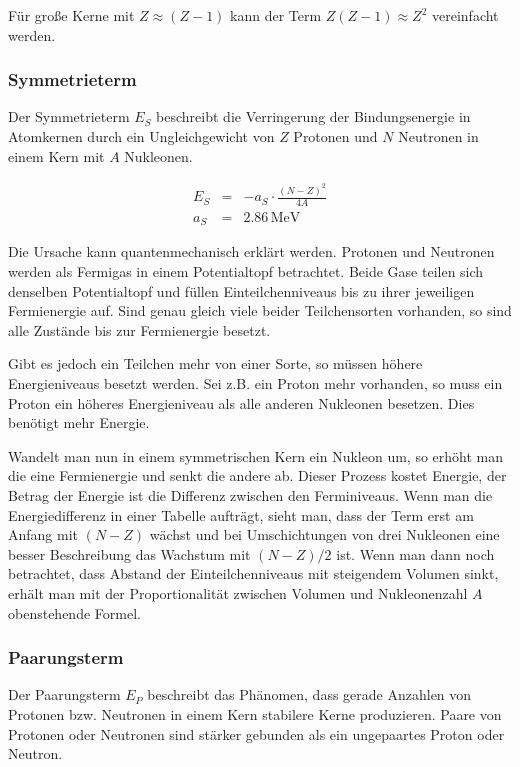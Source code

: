 \documentclass[12pt,a4paper]{scrartcl}
\numberwithin{equation}{section} %
\renewcommand{\[}{} %
\renewcommand{\]}{\noindent} %
\begin{document}
Für große Kerne mit $Z\approx(Z-1)$ kann der Term
$Z(Z-1)\approx Z^2$ vereinfacht werden.

\hypertarget{symmetrieterm}{%
\subsubsection{Symmetrieterm}\label{symmetrieterm}}

Der Symmetrieterm $E_S$ beschreibt die Verringerung der
Bindungsenergie in Atomkernen durch ein Ungleichgewicht von $Z$
Protonen und $N$ Neutronen in einem Kern mit $A$ Nukleonen.

\[
\begin{eqnarray}
        E_S &=& - a_S\cdot \frac{(N-Z)^2}{4A} \\
        a_S &=& 2.86\mathrm{\,MeV}
\end{eqnarray}
\]

Die Ursache kann quantenmechanisch erklärt werden. Protonen und
Neutronen werden als Fermigas in einem Potentialtopf betrachtet. Beide
Gase teilen sich denselben Potentialtopf und füllen Einteilchenniveaus
bis zu ihrer jeweiligen Fermienergie auf. Sind genau gleich viele beider
Teilchensorten vorhanden, so sind alle Zustände bis zur Fermienergie
besetzt.

Gibt es jedoch ein Teilchen mehr von einer Sorte, so müssen höhere
Energieniveaus besetzt werden. Sei z.B. ein Proton mehr vorhanden, so
muss ein Proton ein höheres Energieniveau als alle anderen Nukleonen
besetzen. Dies benötigt mehr Energie.

Wandelt man nun in einem symmetrischen Kern ein Nukleon um, so erhöht
man die eine Fermienergie und senkt die andere ab. Dieser Prozess kostet
Energie, der Betrag der Energie ist die Differenz zwischen den
Ferminiveaus. Wenn man die Energiedifferenz in einer Tabelle aufträgt,
sieht man, dass der Term erst am Anfang mit $(N-Z)$ wächst und bei
Umschichtungen von drei Nukleonen eine besser Beschreibung das Wachstum
mit $(N-Z)/2$ ist. Wenn man dann noch betrachtet, dass Abstand der
Einteilchenniveaus mit steigendem Volumen sinkt, erhält man mit der
Proportionalität zwischen Volumen und Nukleonenzahl $A$ obenstehende
Formel.

\hypertarget{paarungsterm}{%
\subsubsection{Paarungsterm}\label{paarungsterm}}

Der Paarungsterm $E_P$ beschreibt das Phänomen, dass gerade Anzahlen
von Protonen bzw. Neutronen in einem Kern stabilere Kerne produzieren.
Paare von Protonen oder Neutronen sind stärker gebunden als ein
ungepaartes Proton oder Neutron.
\end{document}
